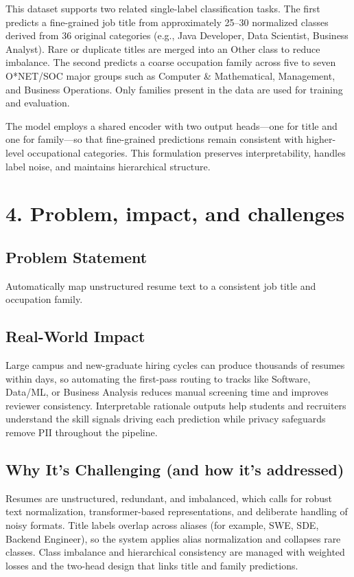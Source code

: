 \documentclass[12pt]{article}
\begin{document}
\medskip

\noindent This dataset supports two related single-label classification tasks. The first predicts a fine-grained job title from approximately 25--30 normalized classes derived from 36 original categories (e.g., Java Developer, Data Scientist, Business Analyst). Rare or duplicate titles are merged into an Other class to reduce imbalance. The second predicts a coarse occupation family across five to seven O*NET/SOC major groups such as Computer \& Mathematical, Management, and Business Operations. Only families present in the data are used for training and evaluation.

\medskip

\noindent The model employs a shared encoder with two output heads---one for title and one for family---so that fine-grained predictions remain consistent with higher-level occupational categories. This formulation preserves interpretability, handles label noise, and maintains hierarchical structure.

\section*{4. Problem, impact, and challenges}
\subsection*{Problem Statement}
Automatically map unstructured resume text to a consistent job title and occupation family.

\medskip

\subsection*{Real-World Impact}
Large campus and new-graduate hiring cycles can produce thousands of resumes within days, so automating the first-pass routing to tracks like Software, Data/ML, or Business Analysis reduces manual screening time and improves reviewer consistency. Interpretable rationale outputs help students and recruiters understand the skill signals driving each prediction while privacy safeguards remove PII throughout the pipeline.

\medskip

\subsection*{Why It's Challenging (and how it's addressed)}
Resumes are unstructured, redundant, and imbalanced, which calls for robust text normalization, transformer-based representations, and deliberate handling of noisy formats. Title labels overlap across aliases (for example, SWE, SDE, Backend Engineer), so the system applies alias normalization and collapses rare classes. Class imbalance and hierarchical consistency are managed with weighted losses and the two-head design that links title and family predictions.
\end{document}
